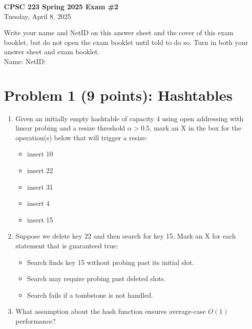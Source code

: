\documentclass[12pt]{article}
\begin{document}
\begin{center}
\textbf{CPSC 223 Spring 2025 Exam \#2}\\
Tuesday, April 8, 2025
\end{center}

\noindent
Write your name and NetID on this answer sheet and the cover of this exam booklet, but do not open the exam booklet until told to do so. Turn in both your answer sheet and exam booklet.\\
Name: \underline{\hspace{3in}} \quad NetID: \underline{\hspace{2in}}

\bigskip

\section*{Problem 1 (9 points): Hashtables}
\begin{enumerate}[label=\alph*)]
\item Given an initially empty hashtable of capacity 4 using open addressing with linear probing and a resize threshold $\alpha>0.5$, mark an X in the box for the operation(s) below that will trigger a resize:

\begin{itemize}
\item [\ ] insert 10
\item [\ ] insert 22
\item [\ ] insert 31
\item [\ ] insert 4
\item [\ ] insert 15
\end{itemize}

\item Suppose we delete key 22 and then search for key 15. Mark an X for each statement that is guaranteed true:

\begin{itemize}
\item [\ ] Search finds key 15 without probing past its initial slot.
\item [\ ] Search may require probing past deleted slots.
\item [\ ] Search fails if a tombstone is not handled.
\end{itemize}

\item What assumption about the hash function ensures average-case $O(1)$ performance? \\
\underline{\hspace{3in}}
\end{enumerate}
\end{document}
